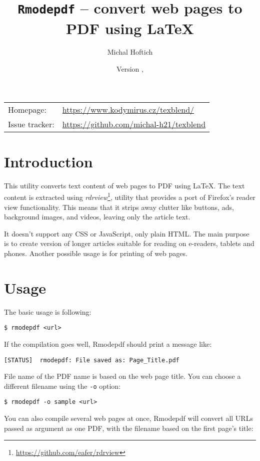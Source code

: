 \documentclass{article}
\author{Michal Hoftich\authormail{michal.h21@gmail.com}}
\title{\texttt{Rmodepdf} -- convert web pages to PDF using \LaTeX}
\date{Version \version, \gitdate}
\begin{document}
\maketitle
\begin{tabular}{l l}
  Homepage: &\url{https://www.kodymirus.cz/texblend/}\\
  Issue tracker:&  \url{https://github.com/michal-h21/texblend}
\end{tabular}
\tableofcontents

\section{Introduction}

This utility converts text content of web pages to PDF using \LaTeX. The text
content is extracted using \textit{rdrview}\footnote{\url{https://github.com/eafer/rdrview}}, utility that provides a port of Firefox's reader
view functionality. This means that it strips away clutter like buttons, ads, background images, and videos, leaving only the article text. 

It doesn't support any CSS or JavaScript, only plain HTML.
The main purpose is to create version of longer articles suitable for reading
on e-readers, tablets and phones. Another possible usage is for printing of web pages.


\section{Usage}

The basic usage is following:

\begin{verbatim}
$ rmodepdf <url>
\end{verbatim}

If the compilation goes well, Rmodepdf should print a message like:

\begin{verbatim}
[STATUS]  rmodepdf: File saved as: Page_Title.pdf
\end{verbatim}

File name of the PDF name is based on the web page title. You can choose
a different filename using the \verb|-o| option:

\begin{verbatim}
$ rmodepdf -o sample <url>
\end{verbatim}

You can also compile several web pages at once, Rmodepdf will convert all URLs
passed as argument as one PDF, with the filename based on the first page's title:
\end{document}

